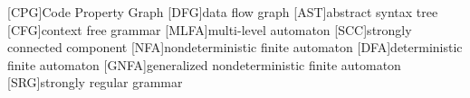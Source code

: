  
[CPG]{Code Property Graph}
[DFG]{data flow graph}
[AST]{abstract syntax tree}
[CFG]{context free grammar}
[MLFA]{multi-level automaton}
[SCC]{strongly connected component}
[NFA]{nondeterministic finite automaton}
[DFA]{deterministic finite automaton}
[GNFA]{generalized nondeterministic finite automaton}
[SRG]{strongly regular grammar}
